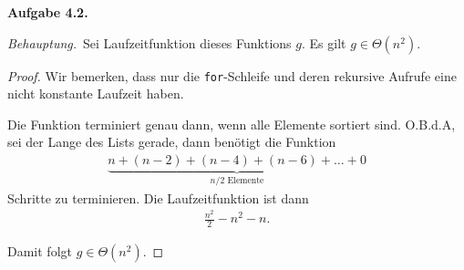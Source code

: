 \documentclass[12pt]{extarticle}
\newcommand{\aufgn}[1]{\textbf{Aufgabe #1.}}
\newcommand{\beh}{\textit{Behauptung.}\ }
\begin{document}
\aufgn{4.2}

\beh Sei Laufzeitfunktion dieses Funktions \(g\).  Es gilt \(g \in \Theta(n^2)\).

\begin{proof}
  Wir bemerken, dass nur die \texttt{for}-Schleife und deren rekursive
  Aufrufe eine nicht konstante Laufzeit haben.

  Die Funktion terminiert genau dann, wenn alle Elemente sortiert
  sind. O.B.d.A, sei der Lange des Lists gerade, dann benötigt die
  Funktion
\begin{align*}
\underbrace{n + (n - 2) + (n - 4) + (n - 6) + \ldots + 0}_{n/2\text{ Elemente}}
\end{align*}
Schritte zu terminieren.  Die Laufzeitfunktion ist dann
\begin{align*}
\frac{n^2}{2}-n^2-n.
\end{align*}

Damit folgt  \(g \in \Theta(n^2)\).
\end{proof}
\end{document}
